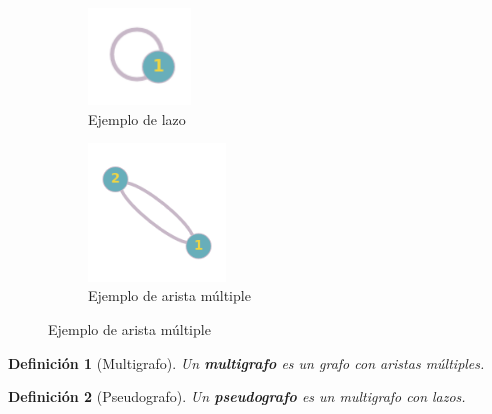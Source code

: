 \documentclass[a4paper,1pt]{report}
\newtheorem*{dfn}{Definición}
\begin{document}
\begin{figure}[h!]
    \centering
    \begin{subfigure}[b]{0.45\textwidth}
    \centering
    \includegraphics[width=0.3\textwidth]{figures/lazo.png}
    \caption{Ejemplo de lazo}
    \end{subfigure}
    \begin{subfigure}[b]{0.45\textwidth}
        \centering
    \includegraphics[width=0.4\textwidth]{figures/multiple.png}
    \caption{Ejemplo de arista m\'ultiple}
    \end{subfigure}
\end{figure} 

\begin{dfn}[Multigrafo]
    Un \textbf{multigrafo} es un grafo con aristas múltiples.
\end{dfn}

\begin{dfn}[Pseudografo]
    Un  \textbf{pseudografo} es un multigrafo con lazos.
\end{dfn}
\end{document}
